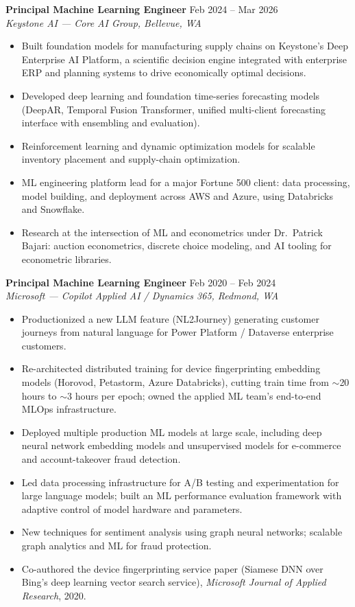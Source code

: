 \documentclass[11pt]{article}
\newcommand{\role}[4]{\textbf{#1} \hfill #4\\ \textit{#2, #3}\vspace{2pt}}
\begin{document}
\role{Principal Machine Learning Engineer}{Keystone AI --- Core AI Group}{Bellevue, WA}{Feb 2024 -- Mar 2026}
\begin{itemize}[leftmargin=14pt, itemsep=1pt, topsep=2pt]
\item Built foundation models for manufacturing supply chains on Keystone's Deep Enterprise AI Platform, a scientific decision engine integrated with enterprise ERP and planning systems to drive economically optimal decisions.
\item Developed deep learning and foundation time-series forecasting models (DeepAR, Temporal Fusion Transformer, unified multi-client forecasting interface with ensembling and evaluation).
\item Reinforcement learning and dynamic optimization models for scalable inventory placement and supply-chain optimization.
\item ML engineering platform lead for a major Fortune 500 client: data processing, model building, and deployment across AWS and Azure, using Databricks and Snowflake.
\item Research at the intersection of ML and econometrics under Dr.\ Patrick Bajari: auction econometrics, discrete choice modeling, and AI tooling for econometric libraries.
\end{itemize}

\role{Principal Machine Learning Engineer}{Microsoft --- Copilot Applied AI / Dynamics 365}{Redmond, WA}{Feb 2020 -- Feb 2024}
\begin{itemize}[leftmargin=14pt, itemsep=1pt, topsep=2pt]
\item Productionized a new LLM feature (NL2Journey) generating customer journeys from natural language for Power Platform / Dataverse enterprise customers.
\item Re-architected distributed training for device fingerprinting embedding models (Horovod, Petastorm, Azure Databricks), cutting train time from $\sim$20 hours to $\sim$3 hours per epoch; owned the applied ML team's end-to-end MLOps infrastructure.
\item Deployed multiple production ML models at large scale, including deep neural network embedding models and unsupervised models for e-commerce and account-takeover fraud detection.
\item Led data processing infrastructure for A/B testing and experimentation for large language models; built an ML performance evaluation framework with adaptive control of model hardware and parameters.
\item New techniques for sentiment analysis using graph neural networks; scalable graph analytics and ML for fraud protection.
\item Co-authored the device fingerprinting service paper (Siamese DNN over Bing's deep learning vector search service), \textit{Microsoft Journal of Applied Research}, 2020.
\end{itemize}
\end{document}
